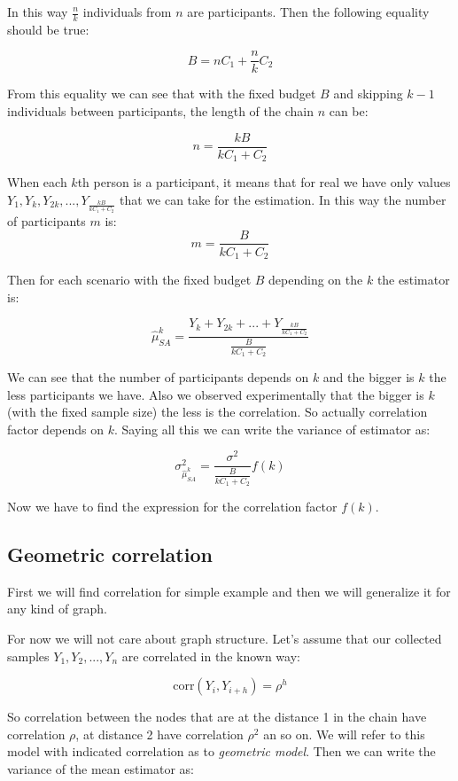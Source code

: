 \documentclass[12pt]{report}
\begin{document}
In this way $\frac{n}{k}$ individuals from $n$ are participants. Then the following equality should be true:

$$B = nC_1 + \frac{n}{k}C_2$$

From this equality we can see that with the fixed budget $B$ and skipping $k-1$ individuals between participants, the length of the chain $n$ can be:

$$n = \frac{kB}{kC_1 + C_2}$$

When each $k$th person is a participant, it means that for real we have only values $Y_1, Y_k, Y_{2k}, ..., Y_{\frac{kB}{kC_1 + C_2}}$ that we can take for the estimation. In this way the number of participants $m$ is:
$$m = \frac{B}{kC_1 + C_2}$$

Then for each scenario with the fixed budget $B$ depending on the $k$ the estimator is:

$$ \widehat{\mu}_{SA}^k = \frac{Y_k+ Y_{2k}+ ...+ Y_{\frac{kB}{kC_1 + C_2}}}{\frac{B}{kC_1 + C_2}}$$


We can see that the number of participants depends on $k$ and the bigger is $k$ the less participants we have.
Also we observed experimentally that the bigger is $k$ (with the fixed sample size) the less is the correlation. So actually correlation factor  depends on $k$.
Saying all this we can write the variance of estimator as:

$$ \sigma^2_{\hat{\mu}_{SA}^k} = \frac{\sigma^2}{\frac{B}{kC_1 + C_2}} f(k)$$


Now we have to find the expression for the correlation factor $f(k)$.

\subsection{Geometric correlation}

First we will find correlation for simple example and then we will generalize it for any kind of graph.

For now we will not care about graph structure. Let's assume that our collected samples $Y_1, Y_2, ..., Y_n$ are correlated in the known way:

 $$\mathrm{corr}(Y_i, Y_{i+h}) = \rho^h$$

So correlation between the nodes that are at the distance 1 in the chain have correlation $\rho$, at distance 2 have correlation $\rho^2$ an so on. We will refer to this model with indicated correlation as to \textit{geometric model}.
Then we can write the variance of the mean estimator as: 
\end{document}
